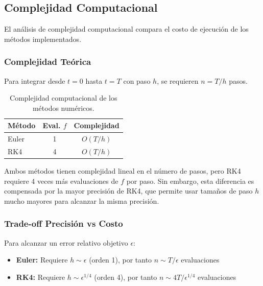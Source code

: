 \documentclass[a4paper,10pt,twocolumn]{article}
\begin{document}
\subsection{Complejidad Computacional}\label{subsec:complejidad}

El análisis de complejidad computacional compara el costo de ejecución de los métodos implementados.

\subsubsection{Complejidad Teórica}

Para integrar desde $t=0$ hasta $t=T$ con paso $h$, se requieren $n = T/h$ pasos.

\begin{table}[H]
\centering
\scriptsize
\begin{tabular}{|l|c|c|}
\hline
\textbf{Método} & \textbf{Eval. $f$} & \textbf{Complejidad} \\
\hline
Euler & 1 & $O(T/h)$ \\
RK4 & 4 & $O(T/h)$ \\
\hline
\end{tabular}
\caption{Complejidad computacional de los métodos numéricos.}
\label{tab:complejidad}
\end{table}

Ambos métodos tienen complejidad lineal en el número de pasos, pero RK4 requiere 4 veces más evaluaciones de $f$ por paso. Sin embargo, esta diferencia es compensada por la mayor precisión de RK4, que permite usar tamaños de paso $h$ mucho mayores para alcanzar la misma precisión.

\subsubsection{Trade-off Precisión vs Costo}

Para alcanzar un error relativo objetivo $\epsilon$:
\begin{itemize}
    \item \textbf{Euler:} Requiere $h \sim \epsilon$ (orden 1), por tanto $n \sim T/\epsilon$ evaluaciones
    \item \textbf{RK4:} Requiere $h \sim \epsilon^{1/4}$ (orden 4), por tanto $n \sim 4T/\epsilon^{1/4}$ evaluaciones
\end{itemize}
\end{document}
